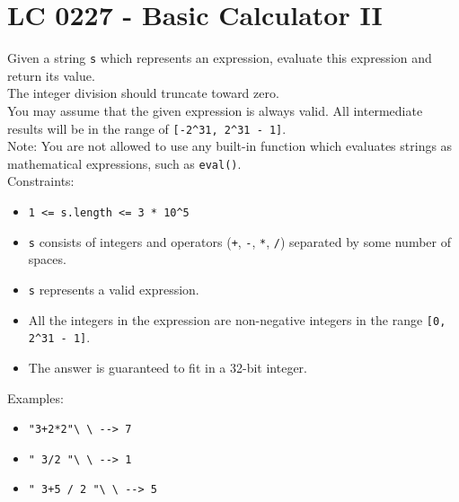 \section{LC 0227 - Basic Calculator II}
Given a string {\colorbox{CodeBackground}{\lstinline|s|}} which represents an expression, evaluate this expression and return its value. \\

The integer division should truncate toward zero.\\

You may assume that the given expression is always valid. All intermediate results will be in the range of {\colorbox{CodeBackground}{\lstinline|[-2^31, 2^31 - 1]|}}.\\

Note: You are not allowed to use any built-in function which evaluates strings as mathematical expressions, such as {\colorbox{CodeBackground}{\lstinline|eval()|}}. \\

Constraints:
\begin{itemize}
	\item {\colorbox{CodeBackground}{\lstinline|1 <= s.length <= 3 * 10^5|}}
	\item {\colorbox{CodeBackground}{\lstinline|s|}} consists of integers and operators ({\colorbox{CodeBackground}{\lstinline|+|}}, {\colorbox{CodeBackground}{\lstinline|-|}}, {\colorbox{CodeBackground}{\lstinline|*|}}, {\colorbox{CodeBackground}{\lstinline|/|}}) separated by some number of spaces.
	\item {\colorbox{CodeBackground}{\lstinline|s|}} represents a valid expression.
	\item All the integers in the expression are non-negative integers in the range {\colorbox{CodeBackground}{\lstinline|[0, 2^31 - 1]|}}.
	\item The answer is guaranteed to fit in a 32-bit integer.
\end{itemize}

Examples:
\begin{itemize}
	\item {\colorbox{CodeBackground}{\lstinline|"3+2*2"\ \ --> 7|}}
	\item {\colorbox{CodeBackground}{\lstinline|" 3/2 "\ \ --> 1|}}
	\item {\colorbox{CodeBackground}{\lstinline|" 3+5 / 2 "\ \ --> 5|}}
\end{itemize}


